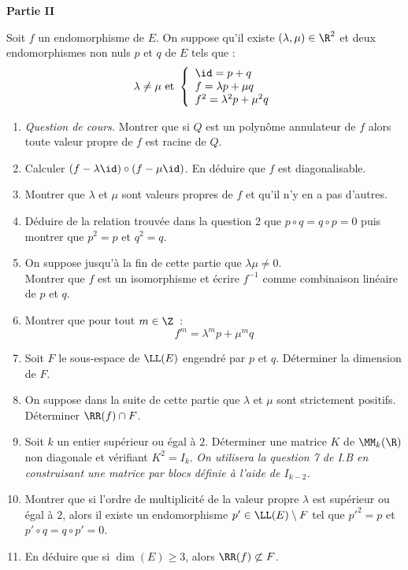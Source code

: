 \documentclass[twoside,french,11pt]{VcCours}
\renewcommand{\l}{\LL(E)}
\begin{document}
\vskip 2cm
\centerline{\bf Partie II}
\bigskip
Soit $f$ un endomorphisme de $E$. On suppose qu'il existe $(\lambda,\mu) \in \R^2$ et deux endomorphismes non nuls $p$ et $q$ de $E$ tels que :
$$
\lambda \not= \mu \ \hbox{et} \ 
\left\{
\begin{array}{l}
\id = p+ q \\
f = \lambda p + \mu q \\
f^2 = \lambda^2 p + \mu^2 q
\end{array}
\right.
$$
\begin{enumerate}
\item \textit{Question de cours.} Montrer que si $Q$ est un polynôme annulateur de $f$ alors toute valeur propre de $f$ est racine de $Q$.
\item Calculer $(f-\lambda \id) \circ (f-\mu \id)$. En déduire que $f$ est diagonalisable.
\item Montrer que $\lambda$ et $\mu$ sont valeurs propres de $f$ et qu'il n'y en a pas d'autres.
\item Déduire de la relation trouvée dans la question 2 que $p \circ q = q \circ p =0$ puis montrer que $p^2=p$ et $q^2=q$.
\item On suppose jusqu'à la fin de cette partie que $\lambda \mu \not= 0$.\\
Montrer que $f$ est un isomorphisme et écrire $f^{-1}$ comme combinaison linéaire de $p$ et $q$.
\item Montrer que pour tout $m \in \Z$~:
$$
f^m = \lambda^m p + \mu^m q
$$
\item  Soit $F$ le sous-espace de $\l$ engendré par $p$ et $q$. Déterminer la dimension de $F$.
\item On suppose dans la suite de cette partie que $\lambda$ et $\mu$ sont strictement positifs. Déterminer $\RR(f) \cap F$.
\item Soit $k$ un entier supérieur ou égal à $2$. Déterminer une matrice $K$ de $\MM_k(\R)$ non diagonale et vérifiant $K^2=I_k$. \textit{On utilisera la question 7 de I.B en construisant une matrice par blocs définie à l'aide de $I_{k-2}$.}
\item Montrer que si l'ordre de multiplicité de la valeur propre $\lambda$ est supérieur ou égal à $2$, alors il existe un endomorphisme $p' \in \l \setminus F$ tel que ${p'}^2=p$ et $p' \circ q = q \circ p' = 0$.
\item En déduire que si $\dim(E) \ge 3$, alors $\RR(f) \not\subset F$.
\end{enumerate}
\end{document}
